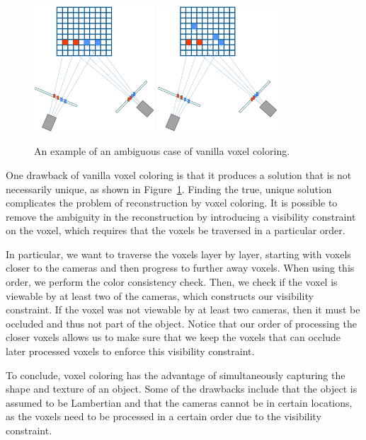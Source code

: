 \documentclass[a4paper, 12pt]{article}
\numberwithin{equation}{section}
\begin{document}
\begin{figure}[h!]
    \centering
    \includegraphics[width = 0.4\textwidth]{figures/ambiguity1.png}
    \includegraphics[width = 0.4\textwidth]{figures/ambiguity2.png}
    \caption{An example of an ambiguous case of vanilla voxel coloring.}
    \label{fig:ambiguity}
\end{figure}

One drawback of vanilla voxel coloring is that it produces a solution that is not necessarily unique, as shown in Figure~\ref{fig:ambiguity}. Finding the true, unique solution complicates the problem of reconstruction by voxel coloring. It is possible to remove the ambiguity in the reconstruction by introducing a visibility constraint on the voxel, which requires that the voxels be traversed in a particular order. 

In particular, we want to traverse the voxels layer by layer, starting with voxels closer to the cameras and then progress to further away voxels. When using this order, we perform the color consistency check. Then, we check if the voxel is viewable by at least two of the cameras, which constructs our visibility constraint. If the voxel was not viewable by at least two cameras, then it must be occluded and thus not part of the object. Notice that our order of processing the closer voxels allows us to make sure that we keep the voxels that can occlude later processed voxels to enforce this visibility constraint. 

To conclude, voxel coloring has the advantage of simultaneously capturing the shape and texture of an object. Some of the drawbacks include that the object is assumed to be Lambertian and that the cameras cannot be in certain locations, as the voxels need to be processed in a certain order due to the visibility constraint.
\end{document}
